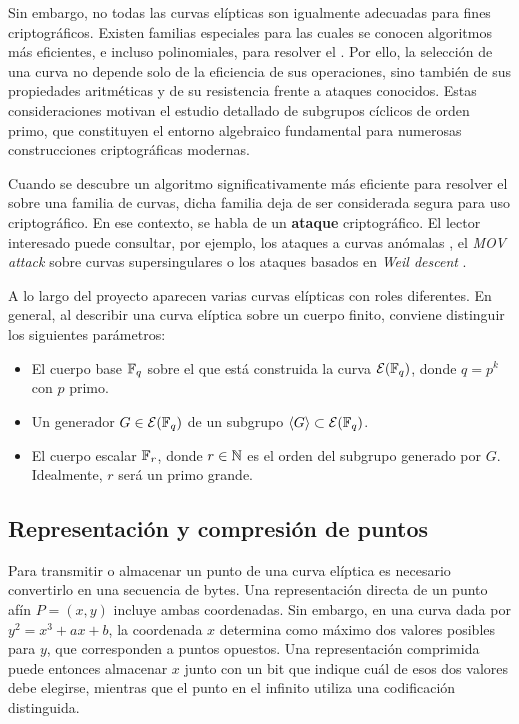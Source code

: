Sin embargo, no todas las curvas elípticas son igualmente adecuadas para fines criptográficos. Existen familias especiales para las cuales se conocen algoritmos más eficientes, e incluso polinomiales, para resolver el \ECDLP. Por ello, la selección de una curva no depende solo de la eficiencia de sus operaciones, sino también de sus propiedades aritméticas y de su resistencia frente a ataques conocidos. Estas consideraciones motivan el estudio detallado de subgrupos cíclicos de orden primo, que constituyen el entorno algebraico fundamental para numerosas construcciones criptográficas modernas.

Cuando se descubre un algoritmo significativamente más eficiente para resolver el \ECDLP sobre una familia de curvas, dicha familia deja de ser considerada segura para uso criptográfico. En ese contexto, se habla de un \textbf{ataque} criptográfico. El lector interesado puede consultar, por ejemplo, los ataques a curvas anómalas \cite{Smart1999}, el \textit{MOV attack} sobre curvas supersingulares \cite{Menezes1993} o los ataques basados en \textit{Weil descent} \cite{Hess2005}.

A lo largo del proyecto aparecen varias curvas elípticas con roles diferentes. En general, al describir una curva elíptica sobre un cuerpo finito, conviene distinguir los siguientes parámetros:
\begin{itemize}
	\item El cuerpo base $\mathbb{F}_q$ sobre el que está construida la curva $\mathcal{E}(\mathbb{F}_q)$, donde $q = p^k$ con $p$ primo.
	\item Un generador $G \in \mathcal{E}(\mathbb{F}_q)$ de un subgrupo $\left\langle G \right\rangle \subset \mathcal{E}(\mathbb{F}_q)$.
	\item El cuerpo escalar $\mathbb{F}_r$, donde $r \in \mathbb{N}$ es el orden del subgrupo generado por $G$. Idealmente, $r$ será un primo grande.
\end{itemize}

\subsection{Representación y compresión de puntos}
\label{subsec:ec-point-compression}

Para transmitir o almacenar un punto de una curva elíptica es necesario convertirlo en una secuencia de bytes. Una representación directa de un punto afín $P=(x,y)$ incluye ambas coordenadas. Sin embargo, en una curva dada por $y^2=x^3+ax+b$, la coordenada $x$ determina como máximo dos valores posibles para $y$, que corresponden a puntos opuestos. Una representación comprimida puede entonces almacenar $x$ junto con un bit que indique cuál de esos dos valores debe elegirse, mientras que el punto en el infinito utiliza una codificación distinguida.

